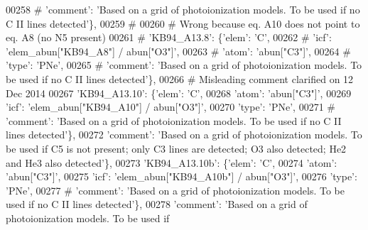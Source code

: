 \begin{DoxyCode}
00258 \textcolor{comment}{#                                      'comment': 'Based on a grid of photoionization models. To be used if
       no C II lines detected'\},}
00259 \textcolor{comment}{#}
00260 \textcolor{comment}{# Wrong because eq. A10 does not point to eq. A8 (no N5 present)}
00261 \textcolor{comment}{#                         'KB94\_A13.8': \{'elem': 'C',}
00262 \textcolor{comment}{#                                      'icf': 'elem\_abun["KB94\_A8"] / abun["O3"]',}
00263 \textcolor{comment}{#                                      'atom': 'abun["C3"]',}
00264 \textcolor{comment}{#                                      'type': 'PNe',}
00265 \textcolor{comment}{#                                      'comment': 'Based on a grid of photoionization models. To be used if
       no C II lines detected'\},}
00266 \textcolor{comment}{# Misleading comment clarified on 12 Dec 2014 }
00267                          \textcolor{stringliteral}{'KB94\_A13.10'}: \{\textcolor{stringliteral}{'elem'}: \textcolor{stringliteral}{'C'},
00268                                       \textcolor{stringliteral}{'atom'}: \textcolor{stringliteral}{'abun["C3"]'},
00269                                       \textcolor{stringliteral}{'icf'}: \textcolor{stringliteral}{'elem\_abun["KB94\_A10"] / abun["O3"]'},
00270                                       \textcolor{stringliteral}{'type'}: \textcolor{stringliteral}{'PNe'},
00271 \textcolor{comment}{#                                     'comment': 'Based on a grid of photoionization models. To be used if
       no C II lines detected'\},}
00272                                       \textcolor{stringliteral}{'comment'}: \textcolor{stringliteral}{'Based on a grid of photoionization models. To be used if
       C5 is not present; only C3 lines are detected; O3 also detected; He2 and He3 also detected'}\},
00273                          \textcolor{stringliteral}{'KB94\_A13.10b'}: \{\textcolor{stringliteral}{'elem'}: \textcolor{stringliteral}{'C'},
00274                                       \textcolor{stringliteral}{'atom'}: \textcolor{stringliteral}{'abun["C3"]'},
00275                                       \textcolor{stringliteral}{'icf'}: \textcolor{stringliteral}{'elem\_abun["KB94\_A10b"] / abun["O3"]'},
00276                                       \textcolor{stringliteral}{'type'}: \textcolor{stringliteral}{'PNe'},
00277 \textcolor{comment}{#                                     'comment': 'Based on a grid of photoionization models. To be used if
       no C II lines detected'\},}
00278                                       \textcolor{stringliteral}{'comment'}: \textcolor{stringliteral}{'Based on a grid of photoionization models. To be used if
}
\end{DoxyCode}
